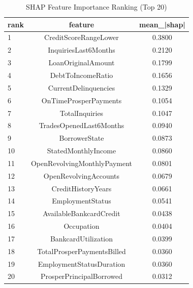 \begin{table}
\centering
\caption{SHAP Feature Importance Ranking (Top 20)}
\label{tab:shap_ranking}
\begin{tabular}{lcc}
\toprule
rank & feature & mean_|shap| \\
\midrule
1 & CreditScoreRangeLower & 0.3800 \\
2 & InquiriesLast6Months & 0.2120 \\
3 & LoanOriginalAmount & 0.1799 \\
4 & DebtToIncomeRatio & 0.1656 \\
5 & CurrentDelinquencies & 0.1329 \\
6 & OnTimeProsperPayments & 0.1054 \\
7 & TotalInquiries & 0.1047 \\
8 & TradesOpenedLast6Months & 0.0940 \\
9 & BorrowerState & 0.0873 \\
10 & StatedMonthlyIncome & 0.0860 \\
11 & OpenRevolvingMonthlyPayment & 0.0801 \\
12 & OpenRevolvingAccounts & 0.0679 \\
13 & CreditHistoryYears & 0.0661 \\
14 & EmploymentStatus & 0.0541 \\
15 & AvailableBankcardCredit & 0.0438 \\
16 & Occupation & 0.0404 \\
17 & BankcardUtilization & 0.0399 \\
18 & TotalProsperPaymentsBilled & 0.0360 \\
19 & EmploymentStatusDuration & 0.0360 \\
20 & ProsperPrincipalBorrowed & 0.0312 \\
\bottomrule
\end{tabular}
\end{table}
